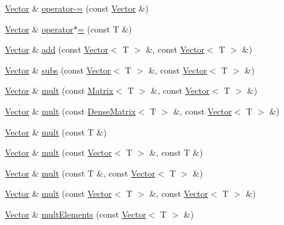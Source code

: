 \begin{DoxyCompactItemize}
\item 
\hyperlink{classlmx_1_1Vector}{Vector} \& \hyperlink{classlmx_1_1Vector_a786fa62693a1d4f990f55b98ce5b0ece}{operator-\/=} (const \hyperlink{classlmx_1_1Vector}{Vector} \&)
\item 
\hyperlink{classlmx_1_1Vector}{Vector} \& \hyperlink{classlmx_1_1Vector_ac104d69fb0485778879ea7e01ca8cc41}{operator$\ast$=} (const T \&)
\item 
\hyperlink{classlmx_1_1Vector}{Vector} \& \hyperlink{classlmx_1_1Vector_ab972d613ec2d693759fce1339b7c2dd7}{add} (const \hyperlink{classlmx_1_1Vector}{Vector}$<$ T $>$ \&, const \hyperlink{classlmx_1_1Vector}{Vector}$<$ T $>$ \&)
\item 
\hyperlink{classlmx_1_1Vector}{Vector} \& \hyperlink{classlmx_1_1Vector_a2fb58669b0c17a07d358499500b994fd}{subs} (const \hyperlink{classlmx_1_1Vector}{Vector}$<$ T $>$ \&, const \hyperlink{classlmx_1_1Vector}{Vector}$<$ T $>$ \&)
\item 
\hyperlink{classlmx_1_1Vector}{Vector} \& \hyperlink{classlmx_1_1Vector_ae68d2b9e72a8a6aa9431e9dcdb126fdc}{mult} (const \hyperlink{classlmx_1_1Matrix}{Matrix}$<$ T $>$ \&, const \hyperlink{classlmx_1_1Vector}{Vector}$<$ T $>$ \&)
\item 
\hyperlink{classlmx_1_1Vector}{Vector} \& \hyperlink{classlmx_1_1Vector_a324cd467e73f7d05e83840da974f2128}{mult} (const \hyperlink{classlmx_1_1DenseMatrix}{Dense\-Matrix}$<$ T $>$ \&, const \hyperlink{classlmx_1_1Vector}{Vector}$<$ T $>$ \&)
\item 
\hyperlink{classlmx_1_1Vector}{Vector} \& \hyperlink{classlmx_1_1Vector_aa5f038fd85d9972fccef411d30e46c1b}{mult} (const T \&)
\item 
\hyperlink{classlmx_1_1Vector}{Vector} \& \hyperlink{classlmx_1_1Vector_aa1a86eaea1fba85d03424c35e3e11fe1}{mult} (const \hyperlink{classlmx_1_1Vector}{Vector}$<$ T $>$ \&, const T \&)
\item 
\hyperlink{classlmx_1_1Vector}{Vector} \& \hyperlink{classlmx_1_1Vector_a69290ccfa8ac2d101a0780343817f1e0}{mult} (const T \&, const \hyperlink{classlmx_1_1Vector}{Vector}$<$ T $>$ \&)
\item 
\hyperlink{classlmx_1_1Vector}{Vector} \& \hyperlink{classlmx_1_1Vector_a8b3ba996acf4c6e45a7d7d1b8739c691}{mult} (const \hyperlink{classlmx_1_1Vector}{Vector}$<$ T $>$ \&, const \hyperlink{classlmx_1_1Vector}{Vector}$<$ T $>$ \&)
\item 
\hyperlink{classlmx_1_1Vector}{Vector} \& \hyperlink{classlmx_1_1Vector_a4c799332f4f2f998330fa7525721091f}{mult\-Elements} (const \hyperlink{classlmx_1_1Vector}{Vector}$<$ T $>$ \&)

\end{DoxyCompactItemize}
